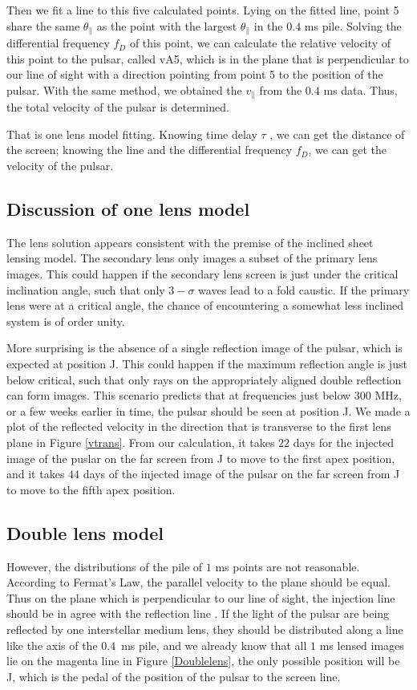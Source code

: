\documentclass{emulateapj}
\begin{document}
Then we fit a line to this five calculated points. Lying on the fitted line, point 5 share the same $\theta_{\parallel}$ as the point with the largest $\theta_{\parallel}$ in the $0.4$ ms pile. Solving the differential frequency ${f_D}$ of this point, we can calculate the relative velocity of this point to the pulsar, called vA5, which is in the plane that is perpendicular to our line of sight with a direction pointing from point 5 to the position of the pulsar. With the same method, we obtained the $v_{\parallel}$ from the $0.4$ ms data. Thus, the total velocity of the pulsar is determined.

That is one lens model fitting. Knowing time delay ${\tau}$ , we can get the distance of the screen; knowing the line and the differential frequency ${f_D}$, we can get the velocity of the pulsar.
\subsection{Discussion of one lens model}

The lens solution appears consistent with the premise of the inclined
sheet lensing model\citep{2014MNRAS.442.3338P}.  The secondary lens
only images a subset of the primary lens images.  This could happen if
the secondary lens screen is just under the critical inclination
angle, such that only $3-\sigma$ waves lead to a fold caustic.  If the
primary lens were at a critical angle, the chance of encountering a
somewhat less inclined system is of order unity.

More surprising is the absence of a single reflection image of the
pulsar, which is expected at position J.  This could happen if the
maximum reflection angle is just below critical, such that only rays
on the appropriately aligned double reflection can form images.  This
scenario predicts that at frequencies just below $300$ MHz, or a few
weeks earlier in time, the pulsar should be seen at position J. We made a plot of the reflected velocity in the direction that is transverse to the first lens plane in Figure \ref{vtrans}.
From our calculation, it takes $22$ days for the injected image of the puslar on the far screen from J to move to the first apex position, and it takes $44$ days of the injected image of the pulsar on the far screen from J to move to the fifth apex position.

\subsection{Double lens model}
However, the distributions of the pile of $1$ ms points are not reasonable. According to Fermat's Law, the parallel velocity to the plane should be equal. Thus on the plane which is perpendicular to our line of sight, the injection line should be in agree with the reflection line . If the light of the pulsar are being reflected by one interstellar medium lens, they should be distributed along a line like the axis of the $0.4$\ ms pile, and we already know that all $1$ ms lensed images lie on the magenta line in Figure \ref{Doublelens}, the only possible position will be J, which is the pedal of the position of the pulsar to the screen line.
\end{document}
